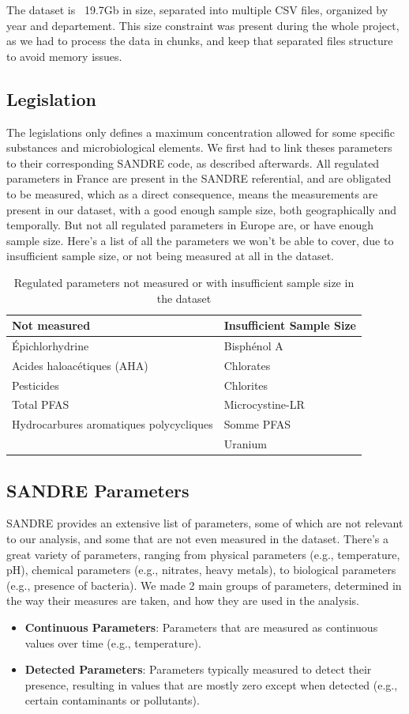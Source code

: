 \documentclass{article}
\begin{document}
The dataset is ~19.7Gb in size, separated into multiple CSV files, organized by year and departement.
This size constraint was present during the whole project, as we had to process the data in chunks, and keep that separated files structure to avoid memory issues.


\subsection{Legislation}
The legislations only defines a maximum concentration allowed for some specific substances and microbiological elements. 
We first had to link theses parameters to their corresponding SANDRE code, as described afterwards.
All regulated parameters in France are present in the SANDRE referential, and are obligated to be measured, which as a direct consequence, means the measurements are present in our dataset, with a good enough sample size, both geographically and temporally.
But not all regulated parameters in Europe are, or have enough sample size.
Here's a list of all the parameters we won't be able to cover, due to insufficient sample size, or not being measured at all in the dataset.

\begin{table}[htbp]
\centering
\begin{tabular}{|l|l|}
\hline
\textbf{Not measured} & \textbf{Insufficient Sample Size} \\
\hline
Épichlorhydrine & Bisphénol A \\
Acides haloacétiques (AHA) & Chlorates \\
Pesticides & Chlorites \\
Total PFAS & Microcystine-LR \\
Hydrocarbures aromatiques polycycliques & Somme PFAS \\
 & Uranium \\
\hline
\end{tabular}
\caption{Regulated parameters not measured or with insufficient sample size in the dataset}
\end{table}

\subsection{SANDRE Parameters}
SANDRE provides an extensive list of parameters, some of which are not relevant to our analysis, and some that are not even measured in the dataset.
There's a great variety of parameters, ranging from physical parameters (e.g., temperature, pH), chemical parameters (e.g., nitrates, heavy metals), to biological parameters (e.g., presence of bacteria).
We made 2 main groups of parameters, determined in the way their measures are taken, and how they are used in the analysis.
\begin{itemize}
    \item \textbf{Continuous Parameters}: Parameters that are measured as continuous values over time (e.g., temperature).
    \item \textbf{Detected Parameters}: Parameters typically measured to detect their presence, resulting in values that are mostly zero except when detected (e.g., certain contaminants or pollutants).
\end{itemize}
\end{document}
